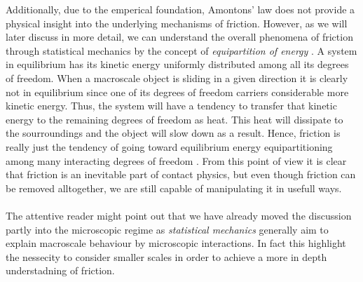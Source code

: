 Additionally, due to the emperical foundation, Amontons’ law does not
provide a physical insight into the underlying mechanisms of friction. However, as we will
later discuss in more detail, we can understand the overall phenomena
of friction through statistical mechanics by the concept of
\textit{equipartition of energy} \cite{Manini_2016}. A system in equilibrium has
its kinetic energy uniformly distributed among all its degrees of freedom. When
a macroscale object is sliding in a given direction it is clearly not in
equilibrium since one of its degrees of freedom carriers considerable more
kinetic energy. Thus, the system will have a tendency to transfer that kinetic
energy to the remaining degrees of freedom as heat. This heat will dissipate to
the sourroundings and the object will slow down as a result. Hence, friction is
really just the tendency of going toward equilibrium energy equipartitioning
among many interacting degrees of freedom \cite{Manini_2016}. From this point of view it is clear that friction is an inevitable part of contact physics, but even though friction can be removed alltogether, we are still capable of manipulating it in usefull ways. 
\\
\\
The attentive reader might point out that we have already moved the discussion partly into the microscopic regime as \textit{statistical mechanics} generally aim to explain macroscale behaviour by microscopic interactions. In fact this highlight the nessecity to consider smaller scales in order to achieve a more in depth understadning of friction.







